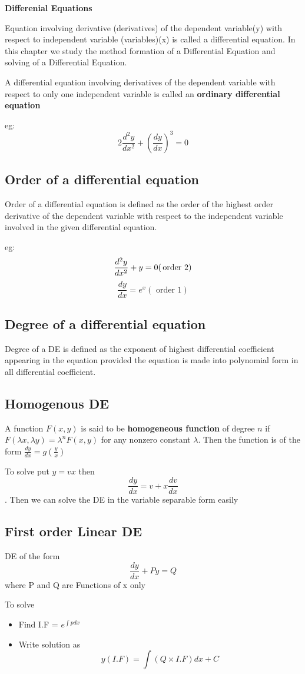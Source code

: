 \documentclass[12pt]{article}
\begin{document}
\begin{center}
    {\LARGE \textbf{Differenial Equations} }
\end{center}
Equation involving derivative (derivatives) of the dependent variable(y)
with respect to independent variable (variables)(x) is called a differential equation. In this chapter we study the method formation of a Differential Equation and solving of a Differential Equation.

A differential equation involving derivatives of the dependent variable with respect
to only one independent variable is called an \textbf{ordinary differential equation}

eg: $$2 \frac{d^2 y}{dx^2}+ \left( \frac{dy}{dx}\right)^3 =0$$
\subsection*{Order of a differential equation}
Order of a differential equation is defined as the order of the highest order derivative of
the dependent variable with respect to the independent variable involved in the given
differential equation.

eg: $$ \frac{d^2y}{dx^2}+ y =0 (\text{\,order 2})$$ $$\frac{dy}{dx}= e^x (\text{ order 1})$$

\subsection*{Degree of a differential equation}
Degree of a DE is defined as the exponent of highest differential coefficient appearing in the equation provided the equation is made into polynomial form in all differential coefficient.
\subsection*{Homogenous DE}
A function $F(x, y)$ is said to be \textbf{homogeneous function} of degree $n$ if $F( \lambda x, \lambda y) = \lambda ^n F(x, y)$ for any nonzero constant $\lambda$. Then the function is of the form $\frac{dy}{dx}=g(\frac{y}{x})$

To solve put $y = vx $ then $$\frac{dy}{dx}=v+x \frac{dv}{dx}$$. Then we can solve the DE in the variable separable form easily 

\subsection*{First order Linear DE}
DE of the form $$\frac{dy}{dx}+Py = Q$$ where P and Q are Functions of x only 

To solve 
\begin{itemize}
    \item Find I.F = $e^{\int p dx}$
    \item Write solution as $$y (I.F) =\int (Q \times I.F)dx +C $$
\end{itemize}
\end{document}
